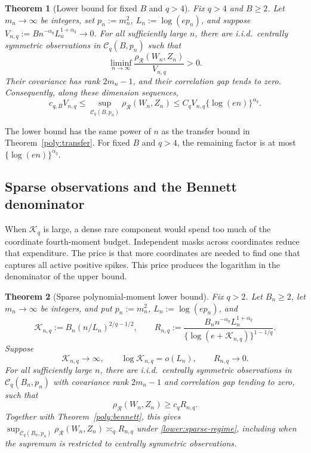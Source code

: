 \documentclass[11pt,letterpaper]{article}
\newtheorem{theorem}{Theorem}
\theoremstyle{remark}
\newcommand{\rh}{\rho_{\mathcal R}}
\begin{document}
\begin{theorem}[Lower bound for fixed \(B\) and \(q>4\)]\label{lower:dense}
Fix \(q>4\) and \(B\ge2\). Let \(m_n\to\infty\) be integers, set
\(p_n:=m_n^2\), \(L_n:=\log(ep_n)\), and suppose
\(V_{n,q}:=Bn^{-\alpha_q}L_n^{1+\alpha_q}\to0\).
For all sufficiently large \(n\), there are i.i.d.\ centrally symmetric
observations in \(\mathcal C_q(B,p_n)\) such that
\begin{equation}
 \liminf_{n\to\infty}\frac{\rh(W_n,Z_n)}{V_{n,q}}>0.
 \label{lower:dense-rate}
\end{equation}
Their covariance has rank \(2m_n-1\), and their correlation gap tends
to zero. Consequently, along these dimension sequences,
\[
 c_{q,B}V_{n,q}
 \le\sup_{\mathcal C_q(B,p_n)}\rh(W_n,Z_n)
 \le C_qV_{n,q}\{\log(en)\}^{\alpha_q}.
\]
\end{theorem}

The lower bound has the same power of \(n\) as the transfer bound in
Theorem~\ref{poly:transfer}. For fixed \(B\) and \(q>4\), the remaining
factor is at most \(\{\log(en)\}^{\alpha_q}\).

\subsection{Sparse observations and the Bennett denominator}

When \(\mathcal K_q\) is large, a dense rare component would spend too much of
the coordinate fourth-moment budget. Independent masks across coordinates
reduce that expenditure. The price is that more coordinates are needed
to find one that captures all active positive spikes. This price produces
the logarithm in the denominator of the upper bound.

\begin{theorem}[Sparse polynomial-moment lower bound]\label{lower:sparse}
Fix \(q>2\). Let \(B_n\ge2\), let \(m_n\to\infty\) be integers,
and put \(p_n:=m_n^2\), \(L_n:=\log(ep_n)\), and
\[
 \mathcal K_{n,q}:=B_n(n/L_n)^{2/q-1/2},\qquad
 R_{n,q}:=\frac{B_n n^{-\alpha_q}L_n^{1+\alpha_q}}
                    {\{\log(e+\mathcal K_{n,q})\}^{1-1/q}}.
\]
Suppose
\begin{equation}
 \mathcal K_{n,q}\longrightarrow\infty,\qquad
 \log \mathcal K_{n,q}=o(L_n),\qquad R_{n,q}\longrightarrow0.
 \label{lower:sparse-regime}
\end{equation}
For all sufficiently large \(n\), there are i.i.d.\ centrally symmetric
observations in \(\mathcal C_q(B_n,p_n)\) with covariance rank
\(2m_n-1\) and correlation gap tending to zero, such that
\begin{equation}
 \rh(W_n,Z_n)\ge c_qR_{n,q}.
 \label{lower:sparse-rate}
\end{equation}
Together with Theorem~\ref{poly:bennett}, this gives
\(\sup_{\mathcal C_q(B_n,p_n)}\rh(W_n,Z_n)\asymp_q R_{n,q}\)
under \eqref{lower:sparse-regime}, including when the supremum is
restricted to centrally symmetric observations.
\end{theorem}
\end{document}
